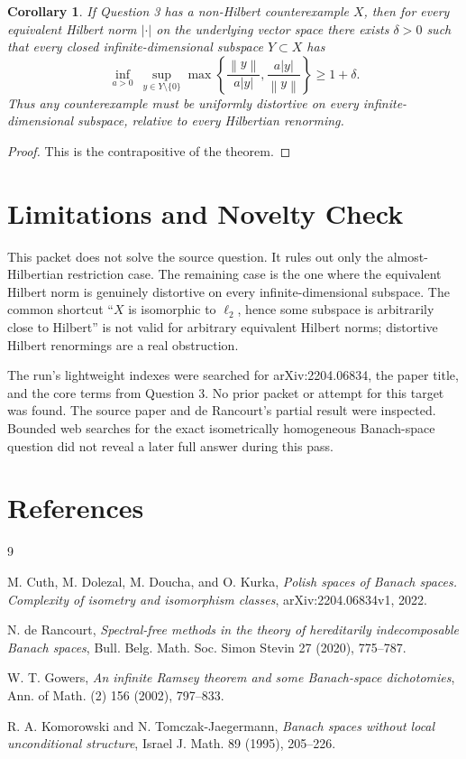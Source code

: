 \documentclass[11pt]{article}
\newtheorem{corollary}{Corollary}
\newcommand{\ellTwo}{\ell_2}
\newcommand{\norm}[1]{\left\lVert #1 \right\rVert}
\newcommand{\hnorm}[1]{\left\lvert #1 \right\rvert}
\begin{document}
\begin{corollary}
If Question 3 has a non-Hilbert counterexample \(X\), then for every equivalent
Hilbert norm \(\hnorm{\cdot}\) on the underlying vector space there exists
\(\delta>0\) such that every closed infinite-dimensional subspace \(Y\subset X\)
has
\[
  \inf_{a>0}\ \sup_{y\in Y\setminus\{0\}}
  \max\left\{
    \frac{\norm{y}}{a\hnorm{y}},
    \frac{a\hnorm{y}}{\norm{y}}
  \right\}
  \geq 1+\delta .
\]
Thus any counterexample must be uniformly distortive on every
infinite-dimensional subspace, relative to every Hilbertian renorming.
\end{corollary}

\begin{proof}
This is the contrapositive of the theorem.
\end{proof}

\section*{Limitations and Novelty Check}

This packet does not solve the source question. It rules out only the
almost-Hilbertian restriction case. The remaining case is the one where the
equivalent Hilbert norm is genuinely distortive on every infinite-dimensional
subspace. The common shortcut ``\(X\) is isomorphic to \(\ellTwo\), hence some
subspace is arbitrarily close to Hilbert'' is not valid for arbitrary
equivalent Hilbert norms; distortive Hilbert renormings are a real obstruction.

The run's lightweight indexes were searched for arXiv:2204.06834, the paper
title, and the core terms from Question 3. No prior packet or attempt for this
target was found. The source paper and de Rancourt's partial result were
inspected. Bounded web searches for the exact isometrically homogeneous
Banach-space question did not reveal a later full answer during this pass.

\section*{References}

\begin{thebibliography}{9}

M. Cuth, M. Dolezal, M. Doucha, and O. Kurka,
\emph{Polish spaces of Banach spaces. Complexity of isometry and isomorphism
classes}, arXiv:2204.06834v1, 2022.

N. de Rancourt,
\emph{Spectral-free methods in the theory of hereditarily indecomposable
Banach spaces}, Bull. Belg. Math. Soc. Simon Stevin 27 (2020), 775--787.

W. T. Gowers,
\emph{An infinite Ramsey theorem and some Banach-space dichotomies},
Ann. of Math. (2) 156 (2002), 797--833.

R. A. Komorowski and N. Tomczak-Jaegermann,
\emph{Banach spaces without local unconditional structure},
Israel J. Math. 89 (1995), 205--226.

\end{thebibliography}
\end{document}
